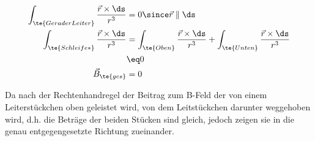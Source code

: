 \documentclass[11pt]{article}
\begin{document}
\subsection{}
\begin{align*}
    \int_{\te{Gerader Leiter}} \frac{\vec r \times \ds}{r^3} &= 0 \since \vec r \parallel \ds\\
    \int_{\te{Schleife*}} \frac{\vec r \times \ds}{r^3} &= 
    \int_{\te{Oben}} \frac{\vec r \times \ds}{r^3} + \int_{\te{Unten}} \frac{\vec r \times \ds}{r^3}\\
    &\eq0 \\
    \vec B_{\te{ges}}&=0
\end{align*}
\begin{adjustwidth}{20pt}{}
    \con Da nach der Rechtenhandregel der Beitrag zum B-Feld der von einem Leiterstückchen oben geleistet
    wird, von dem Leitstückchen darunter weggehoben wird, d.h. die Beträge der beiden Stücken sind gleich,
    jedoch zeigen sie in die genau entgegengesetzte Richtung zueinander.
\end{adjustwidth}
\end{document}
